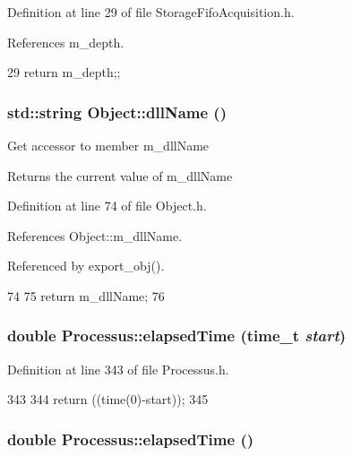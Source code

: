 Definition at line 29 of file StorageFifoAcquisition.h.

References m\_\-depth.


\begin{DoxyCode}
29 {return m_depth;};
\end{DoxyCode}
\hypertarget{classObject_a2e3947f2870094c332d7454117f3ec63}{
\subsubsection[{dllName}]{\setlength{\rightskip}{0pt plus 5cm}std::string Object::dllName ()}}
\label{classObject_a2e3947f2870094c332d7454117f3ec63}
Get accessor to member m\_\-dllName \begin{DoxyReturn}{Returns}
the current value of m\_\-dllName 
\end{DoxyReturn}


Definition at line 74 of file Object.h.

References Object::m\_\-dllName.

Referenced by export\_\-obj().


\begin{DoxyCode}
74                        {
75     return m_dllName;
76   }  
\end{DoxyCode}
\hypertarget{classProcessus_a06d3815ad56593dfd0d3c1f534f8b146}{
\subsubsection[{elapsedTime}]{\setlength{\rightskip}{0pt plus 5cm}double Processus::elapsedTime (time\_\-t {\em start})}}
\label{classProcessus_a06d3815ad56593dfd0d3c1f534f8b146}


Definition at line 343 of file Processus.h.


\begin{DoxyCode}
343                                    {
344     return ((time(0)-start));
345   }
\end{DoxyCode}
\hypertarget{classProcessus_aecca96218c65bc805c988cd95447df55}{
\subsubsection[{elapsedTime}]{\setlength{\rightskip}{0pt plus 5cm}double Processus::elapsedTime ()}}
\label{classProcessus_aecca96218c65bc805c988cd95447df55}


